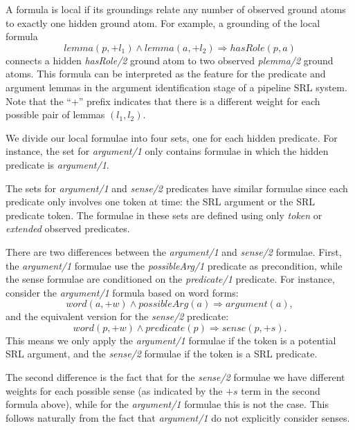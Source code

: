 
A formula is local if its groundings relate any number of observed ground atoms 
to exactly one hidden ground atom.  For example, a grounding of the local 
formula \[lemma(p,+l_1) \wedge lemma(a,+l_2) \Rightarrow hasRole(p,a)\]
connects a hidden \emph{hasRole/2} ground atom to two observed \emph{plemma/2} 
ground atoms. This formula can be interpreted as the feature for the predicate 
and argument lemmas in the argument identification stage of a pipeline SRL 
system.
Note that the ``+'' prefix indicates that there is a different weight for each 
possible pair of lemmas $(l_1,l_2)$.

We divide our local formulae into four sets, one for each hidden predicate.  For 
instance, the set for \emph{argument/1} only contains formulae in which the hidden 
predicate is \emph{argument/1}. 

The sets for \emph{argument/1} and \emph{sense/2} predicates have similar 
formulae since each predicate only involves one token at time: the SRL argument 
or the SRL predicate token. The formulae in these sets are defined using only 
\emph{token} or \emph{extended} observed predicates. 

There are two differences 
between the  \emph{argument/1} and \emph{sense/2} formulae.  First, the \emph{argument/1} formulae use 
the \emph{possibleArg/1} predicate as precondition, while the sense formulae are conditioned on the
\emph{predicate/1} predicate. For instance, consider the \emph{argument/1} 
formula based on word forms: \[word(a,+w) \land possibleArg(a) \Rightarrow 
argument(a),\] and the equivalent version for the \emph{sense/2} predicate: \[word(p,+w) 
\land predicate(p) \Rightarrow sense(p,+s).\] This means we only apply the 
\emph{argument/1} formulae if the token is a potential SRL argument, and 
the \emph{sense/2} formulae if the token is a SRL predicate. 

The second difference is the fact that for the \emph{sense/2} formulae we have different weights for each possible sense (as indicated by the $+s$ term in the second formula above), while for the \emph{argument/1} formulae this is not the case. This follows naturally from the fact that  \emph{argument/1}  do not explicitly consider senses. 


